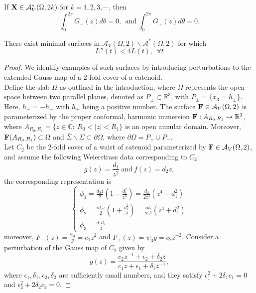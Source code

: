 \documentclass[10pt,a4paper]{amsart}
\begin{document}
\begin{lem} \label{lem: A* implies int G =0}
    If $\bold{X} \in \mathcal{A}_V^*(\Omega ,2k)$ for $k=1,2,3,\cdots$, then 
    $$
    \int_0^{2\pi} G_-(z)d\theta =0,\ \ \text{and}\  \int_0^{2\pi} G_+(z)d\theta =0.
    $$ 
\end{lem}

\begin{theorem} \label{thm: existence for L''<4L}
    There exist minimal surfaces in $\mathcal{A}_V(\Omega,2)\backslash \mathcal{A}^*(\Omega,2)$ for which
    $$
    L''(t)<4L(t),\ \ \forall t
    $$
\end{theorem}

\begin{proof}
    We identify examples of such surfaces by introducing perturbations to the extended Gauss map of a 2-fold cover of a catenoid.\\
 Define the slab $\Omega$ as outlined in the introduction, where $\Omega$ represents the open space between two parallel planes, denoted as $P_{\pm} \subset \mathbb{R}^3$, with $P_{\pm} =\{ x_3 =h_{\pm} \}$. Here, $h_-=-h_+$ with $h_+$ being a positive number. The surface $\bold{F} \in \mathcal{A}_V(\Omega ,2)$ is parameterized by the proper conformal, harmonic immersion $\bold{F}:A_{R_0,R_1} \rightarrow \mathbb{R}^3$, where $A_{R_0,R_1}=\{ z\in \mathbb{C} ;\  R_0< \vert z\vert <R_1 \}$ is an open annular domain. Moreover, $\bold{F}(A_{R_0,R_1}) \subset \Omega$ and $\bar{\Sigma} \backslash \Sigma \subset \partial \Omega$, where $\partial \Omega =  P_+ \cup P_- $. \\
Let $C_2$ be the 2-fold cover of a waist of catenoid parameterized by $\bold{F} \in \mathcal{A}_V(\Omega , 2)$, and assume the following Weierstrass data corresponding to $C_2$:
     $$
     g(z)=\frac{d_1}{z^2} \ \text{and}\ f(z)=d_2z,
     $$
     the corresponding representation is
     $$
     \begin{cases}
         \phi_1 = \frac{d_2z}{2} (1-\frac{d_1^2}{z^4})=\frac{d_2}{2z^3}(z^4-d_1^2) \\
         \phi_2 = \frac{id_2z}{2} (1+\frac{d_1^2}{z^4})=\frac{id_2}{2z^3}(z^4+d_1^2)  \\
         \phi_3 = \frac{d_1d_2}{z}
     \end{cases}
     $$
moreover, $F_-(z)=\frac{\psi_3}{g}=c_1z^2$ and $F_+(z)=\psi_3 g=c_2z^{-2}$.
Consider a perturbation of the Gauss map of $C_2$ given by
    $$
    g(z)=\frac{c_2 z^{-1}+\epsilon_2 +\delta_2 z}{c_1z+\epsilon_1 + \delta_1 z^{-1}},
    $$
   where $\epsilon_1, \delta_1, \epsilon_2, \delta_2$ are sufficiently small numbers, and they satisfy $\epsilon_1^2+2\delta_1c_1=0$ and $\epsilon_2^2+2\delta_2 c_2=0$. 

\end{proof}
\end{document}
